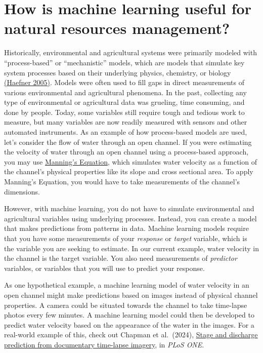 \documentclass[
]{book}
\begin{document}
\hypertarget{how-is-machine-learning-useful-for-natural-resources-management}{%
\section{How is machine learning useful for natural resources management?}\label{how-is-machine-learning-useful-for-natural-resources-management}}

Historically, environmental and agricultural systems were primarily modeled with ``process-based'' or ``mechanistic'' models, which are models that simulate key system processes based on their underlying physics, chemistry, or biology \href{https://link.springer.com/book/10.1007/b106568}{(Haefner 2005)}. Models were often used to fill gaps in direct measurements of various environmental and agricultural phenomena. In the past, collecting any type of environmental or agricultural data was grueling, time consuming, and done by people. Today, some variables still require tough and tedious work to measure, but many variables are now readily measured with sensors and other automated instruments.
As an example of how process-based models are used, let's consider the flow of water through an open channel. If you were estimating the velocity of water through an open channel using a process-based approach, you may use \href{https://www.weather.gov/aprfc/normaldepthcalc}{Manning's Equation}, which simulates water velocity as a function of the channel's physical properties like its slope and cross sectional area. To apply Manning's Equation, you would have to take measurements of the channel's dimensions.

However, with machine learning, you do not have to simulate environmental and agricultural variables using underlying processes. Instead, you can create a model that makes predictions from patterns in data. Machine learning models require that you have some measurements of your \emph{response} or \emph{target} variable, which is the variable you are seeking to estimate. In our current example, water velocity in the channel is the target variable. You also need measurements of \emph{predictor} variables, or variables that you will use to predict your response.

As one hypothetical example, a machine learning model of water velocity in an open channel might make predictions based on images instead of physical channel properties. A camera could be situated towards the channel to take time-lapse photos every few minutes. A machine learning model could then be developed to predict water velocity based on the appearance of the water in the images. For a real-world example of this, check out Chapman et al.~(2024), \href{https://journals.plos.org/water/article?id=10.1371/journal.pwat.0000106}{Stage and discharge prediction from documentary time-lapse imagery}, in \emph{PLoS ONE}.
\end{document}
